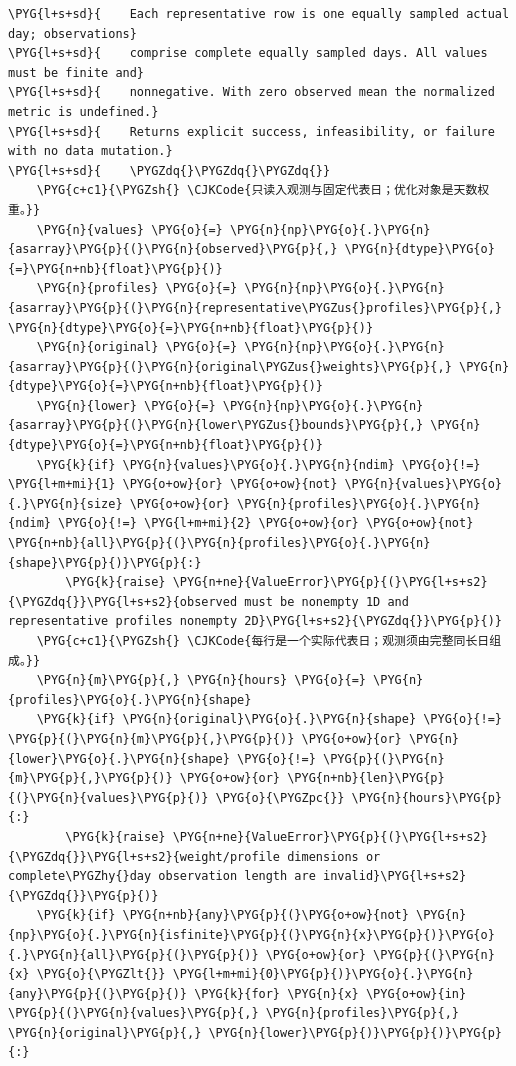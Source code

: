 \begin{Verbatim}
\PYG{l+s+sd}{    Each representative row is one equally sampled actual day; observations}
\PYG{l+s+sd}{    comprise complete equally sampled days. All values must be finite and}
\PYG{l+s+sd}{    nonnegative. With zero observed mean the normalized metric is undefined.}
\PYG{l+s+sd}{    Returns explicit success, infeasibility, or failure with no data mutation.}
\PYG{l+s+sd}{    \PYGZdq{}\PYGZdq{}\PYGZdq{}}
    \PYG{c+c1}{\PYGZsh{} \CJKCode{只读入观测与固定代表日；优化对象是天数权重。}}
    \PYG{n}{values} \PYG{o}{=} \PYG{n}{np}\PYG{o}{.}\PYG{n}{asarray}\PYG{p}{(}\PYG{n}{observed}\PYG{p}{,} \PYG{n}{dtype}\PYG{o}{=}\PYG{n+nb}{float}\PYG{p}{)}
    \PYG{n}{profiles} \PYG{o}{=} \PYG{n}{np}\PYG{o}{.}\PYG{n}{asarray}\PYG{p}{(}\PYG{n}{representative\PYGZus{}profiles}\PYG{p}{,} \PYG{n}{dtype}\PYG{o}{=}\PYG{n+nb}{float}\PYG{p}{)}
    \PYG{n}{original} \PYG{o}{=} \PYG{n}{np}\PYG{o}{.}\PYG{n}{asarray}\PYG{p}{(}\PYG{n}{original\PYGZus{}weights}\PYG{p}{,} \PYG{n}{dtype}\PYG{o}{=}\PYG{n+nb}{float}\PYG{p}{)}
    \PYG{n}{lower} \PYG{o}{=} \PYG{n}{np}\PYG{o}{.}\PYG{n}{asarray}\PYG{p}{(}\PYG{n}{lower\PYGZus{}bounds}\PYG{p}{,} \PYG{n}{dtype}\PYG{o}{=}\PYG{n+nb}{float}\PYG{p}{)}
    \PYG{k}{if} \PYG{n}{values}\PYG{o}{.}\PYG{n}{ndim} \PYG{o}{!=} \PYG{l+m+mi}{1} \PYG{o+ow}{or} \PYG{o+ow}{not} \PYG{n}{values}\PYG{o}{.}\PYG{n}{size} \PYG{o+ow}{or} \PYG{n}{profiles}\PYG{o}{.}\PYG{n}{ndim} \PYG{o}{!=} \PYG{l+m+mi}{2} \PYG{o+ow}{or} \PYG{o+ow}{not} \PYG{n+nb}{all}\PYG{p}{(}\PYG{n}{profiles}\PYG{o}{.}\PYG{n}{shape}\PYG{p}{)}\PYG{p}{:}
        \PYG{k}{raise} \PYG{n+ne}{ValueError}\PYG{p}{(}\PYG{l+s+s2}{\PYGZdq{}}\PYG{l+s+s2}{observed must be nonempty 1D and representative profiles nonempty 2D}\PYG{l+s+s2}{\PYGZdq{}}\PYG{p}{)}
    \PYG{c+c1}{\PYGZsh{} \CJKCode{每行是一个实际代表日；观测须由完整同长日组成。}}
    \PYG{n}{m}\PYG{p}{,} \PYG{n}{hours} \PYG{o}{=} \PYG{n}{profiles}\PYG{o}{.}\PYG{n}{shape}
    \PYG{k}{if} \PYG{n}{original}\PYG{o}{.}\PYG{n}{shape} \PYG{o}{!=} \PYG{p}{(}\PYG{n}{m}\PYG{p}{,}\PYG{p}{)} \PYG{o+ow}{or} \PYG{n}{lower}\PYG{o}{.}\PYG{n}{shape} \PYG{o}{!=} \PYG{p}{(}\PYG{n}{m}\PYG{p}{,}\PYG{p}{)} \PYG{o+ow}{or} \PYG{n+nb}{len}\PYG{p}{(}\PYG{n}{values}\PYG{p}{)} \PYG{o}{\PYGZpc{}} \PYG{n}{hours}\PYG{p}{:}
        \PYG{k}{raise} \PYG{n+ne}{ValueError}\PYG{p}{(}\PYG{l+s+s2}{\PYGZdq{}}\PYG{l+s+s2}{weight/profile dimensions or complete\PYGZhy{}day observation length are invalid}\PYG{l+s+s2}{\PYGZdq{}}\PYG{p}{)}
    \PYG{k}{if} \PYG{n+nb}{any}\PYG{p}{(}\PYG{o+ow}{not} \PYG{n}{np}\PYG{o}{.}\PYG{n}{isfinite}\PYG{p}{(}\PYG{n}{x}\PYG{p}{)}\PYG{o}{.}\PYG{n}{all}\PYG{p}{(}\PYG{p}{)} \PYG{o+ow}{or} \PYG{p}{(}\PYG{n}{x} \PYG{o}{\PYGZlt{}} \PYG{l+m+mi}{0}\PYG{p}{)}\PYG{o}{.}\PYG{n}{any}\PYG{p}{(}\PYG{p}{)} \PYG{k}{for} \PYG{n}{x} \PYG{o+ow}{in} \PYG{p}{(}\PYG{n}{values}\PYG{p}{,} \PYG{n}{profiles}\PYG{p}{,} \PYG{n}{original}\PYG{p}{,} \PYG{n}{lower}\PYG{p}{)}\PYG{p}{)}\PYG{p}{:}

\end{Verbatim}
